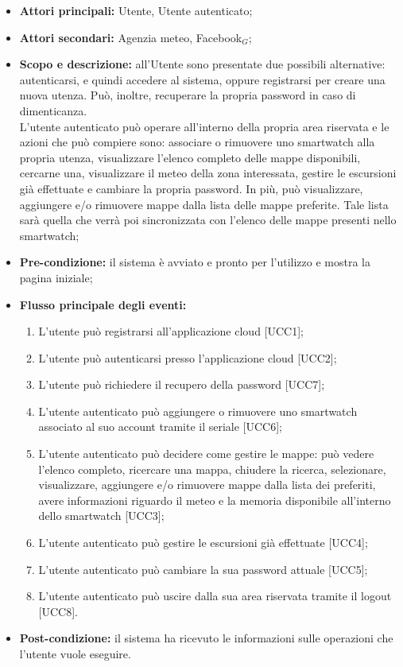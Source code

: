 \begin{itemize}
\item \textbf{Attori principali:} Utente, Utente autenticato;
\item \textbf{Attori secondari:} Agenzia meteo, Facebook$_{G}$;
\item \textbf{Scopo e descrizione:} all'Utente sono presentate due possibili alternative: autenticarsi, e quindi accedere al sistema, oppure registrarsi per creare una nuova utenza. Può, inoltre, recuperare la propria password in caso di dimenticanza.\\ 
L’utente autenticato può operare all’interno della propria area riservata e le azioni che può compiere sono: associare o rimuovere uno smartwatch alla propria utenza, visualizzare l'elenco completo delle mappe disponibili, cercarne una, visualizzare il meteo della zona interessata, gestire le escursioni già effettuate e cambiare la propria password. In più, può visualizzare, aggiungere e/o rimuovere mappe dalla lista delle mappe preferite. Tale lista sarà quella che verrà poi sincronizzata con l'elenco delle mappe presenti nello smartwatch;
\item \textbf{Pre-condizione:} il sistema è avviato e pronto per l'utilizzo e mostra la pagina iniziale; 
\item \textbf{Flusso principale degli eventi:} 
\begin{enumerate}
\item L’utente può registrarsi all’applicazione cloud [UCC1];
\item L’utente può autenticarsi presso l’applicazione cloud [UCC2];
\item L'utente può richiedere il recupero della password [UCC7];
\item L’utente autenticato può aggiungere o rimuovere uno smartwatch associato al suo account tramite il seriale [UCC6];
\item L’utente autenticato può decidere come gestire le mappe: può vedere l'elenco completo, ricercare una mappa, chiudere la ricerca, selezionare, visualizzare, aggiungere e/o rimuovere mappe dalla lista dei preferiti, avere informazioni riguardo il meteo e la memoria disponibile all'interno dello smartwatch [UCC3];
\item L’utente autenticato può gestire le escursioni già effettuate [UCC4];
\item L'utente autenticato può cambiare la sua password attuale [UCC5];
\item L'utente autenticato può uscire dalla sua area riservata tramite il logout [UCC8].
\end{enumerate}
\item \textbf{Post-condizione:} il sistema ha ricevuto le informazioni sulle operazioni che l’utente vuole eseguire.
\end{itemize}

